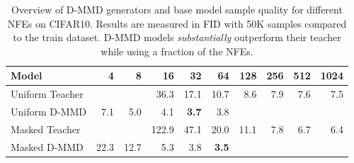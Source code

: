 \begin{table}[t]
    \centering
    \begin{tabular}{l|rrrrrrrrr}
        \toprule
         \bfseries Model & 4 & 8 & 16 & 32 & 64 & 128 & 256 & 512 & 1024 \\ \midrule
        Uniform Teacher & & & 36.3 & 17.1 & 10.7 & 8.6 & 7.9 & 7.6 & 7.5 \\
        Uniform D-MMD & 7.1 & 5.0 & 4.1 & \textbf{3.7} & 3.8  \\ \midrule %
        Masked Teacher & & & 122.9 & 47.1 & 20.0 & 11.1 & 7.8 & 6.7 & 6.4 \\
        Masked D-MMD & 22.3 & 12.7 & 5.3 & 3.8 & \textbf{3.5} \\
        \bottomrule
    \end{tabular}
    \caption{Overview of D-MMD generators and base model sample quality for different NFEs on CIFAR10.
    Results are measured in FID with 50K samples compared to the train dataset. D-MMD models \textit{substantially} outperform their teacher while using a fraction of the NFEs.
    }
    \label{tab:cifar10_overview}
\end{table}
